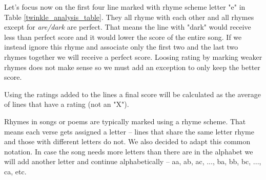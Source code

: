 Let's focus now on the first four line marked with rhyme scheme letter "e" in Table \ref{twinkle_analysis_table}. They all rhyme with each other and all rhymes except for \textit{are/dark} are perfect. That means the line with "dark" would receive less than perfect score and it would lower the score of the entire song. If we instead ignore this rhyme and associate only the first two and the last two rhymes together we will receive a perfect score. Loosing rating by marking weaker rhymes does not make sense so we must add an exception to only keep the better score.

Using the ratings added to the lines a final score will be calculated as the average of lines that have a rating (not an "X").



 Rhymes in songs or poems are typically marked using a rhyme scheme. That means each verse gets assigned a letter -- lines that share the same letter rhyme and those with different letters do not. We also decided to adapt this common notation. In case the song needs more letters than there are in the alphabet we will add another letter and continue alphabetically -- aa, ab, ac, ..., ba, bb, bc, ..., ca, etc.


